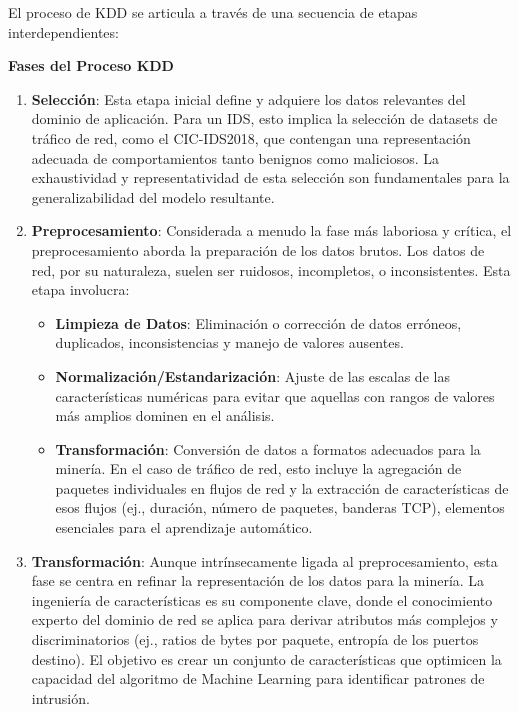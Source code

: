 El proceso de KDD se articula a través de una secuencia de etapas interdependientes:

\textbf{Fases del Proceso KDD}
\begin{enumerate}

    \item\textbf{Selección}: Esta etapa inicial define y adquiere los datos relevantes del dominio de aplicación. Para un IDS, esto implica la selección de datasets de tráfico de red, como el CIC-IDS2018, que contengan una representación adecuada de comportamientos tanto benignos como maliciosos. La exhaustividad y representatividad de esta selección son fundamentales para la generalizabilidad del modelo resultante.
    
    \item\textbf{Preprocesamiento}: Considerada a menudo la fase más laboriosa y crítica, el preprocesamiento aborda la preparación de los datos brutos. Los datos de red, por su naturaleza, suelen ser ruidosos, incompletos, o inconsistentes. Esta etapa involucra:
    \begin{itemize}

        \item\textbf{Limpieza de Datos}: Eliminación o corrección de datos erróneos, duplicados, inconsistencias y manejo de valores ausentes.
        
        \item\textbf{Normalización/Estandarización}: Ajuste de las escalas de las características numéricas para evitar que aquellas con rangos de valores más amplios dominen en el análisis.
        
        \item\textbf{Transformación}: Conversión de datos a formatos adecuados para la minería. En el caso de tráfico de red, esto incluye la agregación de paquetes individuales en flujos de red y la extracción de características de esos flujos (ej., duración, número de paquetes, banderas TCP), elementos esenciales para el aprendizaje automático.
          
    \end{itemize}
    \item\textbf{Transformación}: Aunque intrínsecamente ligada al preprocesamiento, esta fase se centra en refinar la representación de los datos para la minería. La ingeniería de características es su componente clave, donde el conocimiento experto del dominio de red se aplica para derivar atributos más complejos y discriminatorios (ej., ratios de bytes por paquete, entropía de los puertos destino). El objetivo es crear un conjunto de características que optimicen la capacidad del algoritmo de Machine Learning para identificar patrones de intrusión.
    

\end{enumerate}

